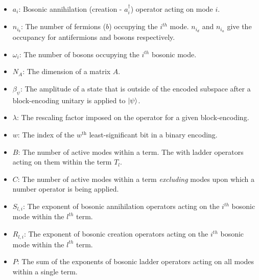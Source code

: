 \begin{itemize}
    \item $a_i$: Bosonic annihilation (creation - $a_i^\dagger$) operator acting on mode $i$.
    \item $n_{i_b}$: The number of fermions ($b$) occupying the $i^{th}$ mode. $n_{i_d}$ and $n_{i_a}$ give the occupancy for antifermions and bosons respectively.
    \item $\omega_{i}$: The number of bosons occupying the $i^{th}$ bosonic mode.
    \item $N_A$: The dimension of a matrix $A$.
    \item $\beta_\psi$: The amplitude of a state that is outside of the encoded subspace after a block-encoding unitary is applied to $\ket{\psi}$.
    \item $\lambda$: The rescaling factor imposed on the operator for a given block-encoding.
    \item $w$: The index of the $w^\text{th}$ least-significant bit in a binary encoding.
    \item $B$: The number of active modes within a term. The  with ladder operators acting on them within the term $T_l$.
    \item $C$: The number of active modes within a term \textit{excluding} modes upon which a number operator is being applied.
    \item $S_{l, i}$: The exponent of bosonic annihilation operators acting on the $i^{th}$ bosonic mode within the $l^{th}$ term.
    \item $R_{l, i}$: The exponent of bosonic creation operators acting on the $i^{th}$ bosonic mode within the $l^{th}$ term.
    \item $P$: The sum of the exponents of bosonic ladder operators acting on all modes within a single term.
\end{itemize}